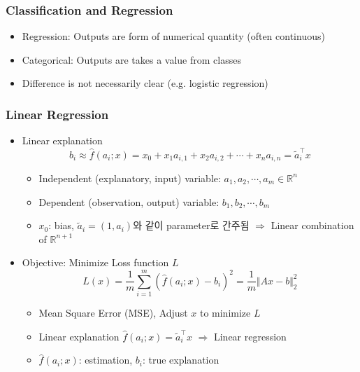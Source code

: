 \subsubsection*{Classification and Regression}
\begin{itemize}
    \item Regression: Outputs are form of numerical quantity (often continuous)
    \item Categorical: Outputs are takes a value from classes
    \item Difference is not necessarily clear (e.g. logistic regression)
\end{itemize}

\subsubsection*{Linear Regression}
\begin{itemize}
    \item Linear explanation
    \begin{equation}
        b_i\approx\hat{f}(a_i;x)=x_0+x_1a_{i,1}+x_2a_{i,2}+\cdots+x_na_{i,n}=\tilde{a}_i^{\top}x
    \end{equation}
    \begin{itemize}
        \item Independent (explanatory, input) variable: $a_1,a_2,\cdots,a_m\in\mathbb{R}^n$
        \item Dependent (observation, output) variable: $b_1,b_2,\cdots,b_m$
        \item $x_0$: bias, $\tilde{a}_i=(1,a_i)$와 같이 parameter로 간주됨 $\Rightarrow$ Linear combination of $\mathbb{R}^{n+1}$
    \end{itemize}
    \item Objective: Minimize Loss function $L$
    \begin{equation}
        L(x)=\frac{1}{m}\sum_{i=1}^{m}\left(\hat{f}(a_i;x)-b_i\right)^2 = \frac{1}{m}\Vert Ax-b\Vert_2^2
    \end{equation}
    \begin{itemize}
        \item Mean Square Error (MSE), Adjust $x$ to minimize $L$
        \item Linear explanation $\hat{f}(a_i;x)=\tilde{a}_i^{\top}x$ $\Rightarrow$ Linear regression
        \item $\hat{f}(a_i;x)$: estimation, $b_i$: true explanation
    \end{itemize}
\end{itemize}

